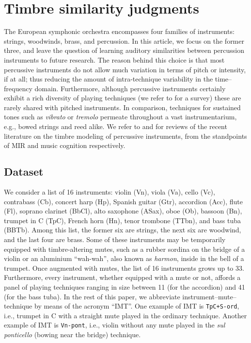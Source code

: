 \documentclass{bmcart}
\makeatletter
\newcommand{\nmu}{}
\newcommand*{\eg}{e.g.,\@\xspace}
\newcommand*{\ie}{i.e.,\@\xspace}
\makeatother
\begin{document}

\section*{\nmu Timbre similarity judgments}
\label{sec:survey}

The European symphonic orchestra encompasses four families of instruments: strings, woodwinds, brass, and percussion.
In this article, we focus on the former three, and leave the question of learning auditory similarities between percussion instruments to future research.
The reason behind this choice is that most percussive instruments do not allow much variation in terms of pitch or intensity, if at all; thus reducing the amount of intra-technique variability in the time--frequency domain.
Furthermore, although percussive instruments certainly exhibit a rich diversity of playing techniques (we refer to \cite{peinkofer1976book} for a survey) these are rarely shared with pitched instruments.
In comparison, techniques for sustained tones such as \emph{vibrato} or \emph{tremolo} permeate throughout a vast instrumentarium, \eg{} bowed strings and reed alike.
We refer to \cite{wu2018taslp} and \cite{pearce2019appliedsciences} for reviews of the recent literature on the timbre modeling of percussive instruments, from the standpoints of MIR and music cognition respectively.

\subsection*{Dataset}
We consider a list of 16 instruments: violin (Vn), viola (Va), cello (Vc), contrabass (Cb), concert harp (Hp), Spanish guitar (Gtr), accordion (Acc), flute (Fl), soprano clarinet (BbCl), alto saxophone (ASax), oboe (Ob), bassoon (Bn), trumpet in C (TpC), French horn (Hn), tenor trombone (TTbn), and bass tuba (BBTb).
Among this list, the former six are strings, the next six are woodwind, and the last four are brass.
Some of these instruments may be temporarily equipped with timbre-altering mutes, such as a rubber sordina on the bridge of a violin or an aluminium ``wah-wah'', also known as \emph{harmon}, inside in the bell of a trumpet.
Once augmented with mutes, the list of 16 instruments grows up to 33.
Furthermore, every instrument, whether equipped with a mute or not, affords a panel of playing techniques ranging in size between 11 (for the accordion) and 41 (for the bass tuba).
In the rest of this paper, we abbreviate instrument--mute--technique by means of the acronym ``IMT''.
One example of IMT is \texttt{TpC+S-ord}, \ie{} trumpet in C with a straight mute played in the ordinary technique.
Another example of IMT is \texttt{Vn-pont}, \ie{} violin without any mute played in the \emph{sul ponticello} (bowing near the bridge) technique.
\end{document}
